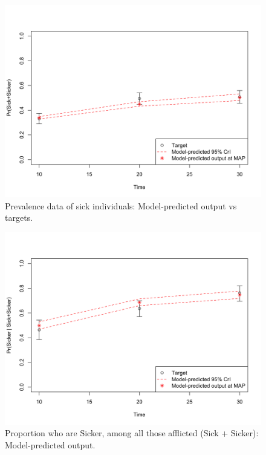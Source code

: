 \documentclass[]{book}
\begin{document}
\begin{figure}

{\centering \includegraphics[width=1\linewidth]{../figs/04_posterior_vs_targets_prevalence} 

}

\caption{Prevalence data of sick individuals: Model-predicted output vs targets.}\label{fig:04-prevalence}
\end{figure}

\begin{figure}

{\centering \includegraphics[width=1\linewidth]{../figs/04_posterior_vs_targets_proportion_sicker} 

}

\caption{Proportion who are Sicker, among all those afflicted (Sick + Sicker): Model-predicted output.}\label{fig:04-proportion}
\end{figure}
\end{document}
